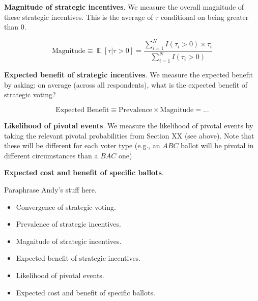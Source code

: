\documentclass[12pt, letter]{article}
\DeclareMathOperator{\EX}{\mathbb{E}} %
\begin{document}
\textbf{Magnitude of strategic incentives}. We measure the overall magnitude of these strategic incentives. This is the average of $\tau$ conditional on being greater than $0$.

\begin{equation}
	\text{Magnitude} \equiv \EX[\tau | \tau > 0] = \frac{\sum^N_{i = 1} I(\tau_i > 0) \times \tau_i}{\sum^N_{i = 1} I(\tau_i > 0)}
\end{equation}

\textbf{Expected benefit of strategic incentives}. We measure the expected benefit by asking: on average (across all respondents), what is the expected benefit of strategic voting?

\begin{equation}
	\text{Expected Benefit} \equiv \text{Prevalence} \times \text{Magnitude} = ...
\end{equation}

\textbf{Likelihood of pivotal events}. We measure the likelihood of pivotal events by taking the relevant pivotal probabilities from Section XX (see above). Note that these will be different for each voter type (e.g., an $ABC$ ballot will be pivotal in different circumstances than a $BAC$ one)

\textbf{Expected cost and benefit of specific ballots}.

Paraphrase Andy's stuff here.

\begin{itemize}
	\item Convergence of strategic voting.
	\item Prevalence of strategic incentives.
	\item Magnitude of strategic incentives.
	\item Expected benefit of strategic incentives.
	\item Likelihood of pivotal events.
	\item Expected cost and benefit of specific ballots.
\end{itemize}



\end{document}
